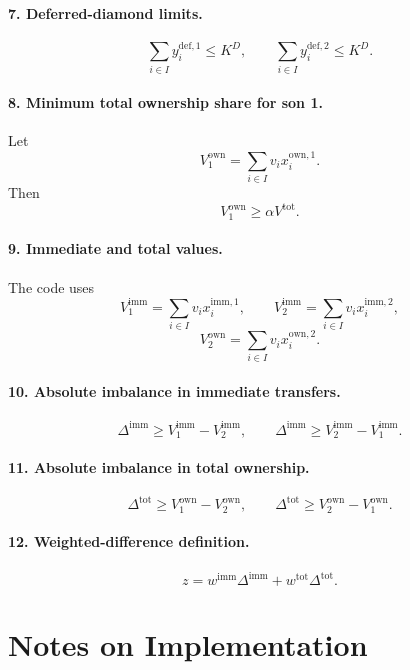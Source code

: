 \paragraph{7. Deferred-diamond limits.}
\[
\sum_{i\in I} y^{\mathrm{def},1}_i \le K^{D},
\qquad
\sum_{i\in I} y^{\mathrm{def},2}_i \le K^{D}.
\]

\paragraph{8. Minimum total ownership share for son 1.}
Let
\[
V^{\mathrm{own}}_1=\sum_{i\in I} v_i x^{\mathrm{own},1}_i.
\]
Then
\[
V^{\mathrm{own}}_1 \ge \alpha V^{\mathrm{tot}}.
\]

\paragraph{9. Immediate and total values.}
The code uses
\[
V^{\mathrm{imm}}_1=\sum_{i\in I} v_i x^{\mathrm{imm},1}_i,\qquad
V^{\mathrm{imm}}_2=\sum_{i\in I} v_i x^{\mathrm{imm},2}_i,
\]
\[
V^{\mathrm{own}}_2=\sum_{i\in I} v_i x^{\mathrm{own},2}_i.
\]

\paragraph{10. Absolute imbalance in immediate transfers.}
\[
\Delta^{\mathrm{imm}} \ge V^{\mathrm{imm}}_1 - V^{\mathrm{imm}}_2,
\qquad
\Delta^{\mathrm{imm}} \ge V^{\mathrm{imm}}_2 - V^{\mathrm{imm}}_1.
\]

\paragraph{11. Absolute imbalance in total ownership.}
\[
\Delta^{\mathrm{tot}} \ge V^{\mathrm{own}}_1 - V^{\mathrm{own}}_2,
\qquad
\Delta^{\mathrm{tot}} \ge V^{\mathrm{own}}_2 - V^{\mathrm{own}}_1.
\]

\paragraph{12. Weighted-difference definition.}
\[
z = w^{\mathrm{imm}} \Delta^{\mathrm{imm}} + w^{\mathrm{tot}} \Delta^{\mathrm{tot}}.
\]

\section*{Notes on Implementation}

